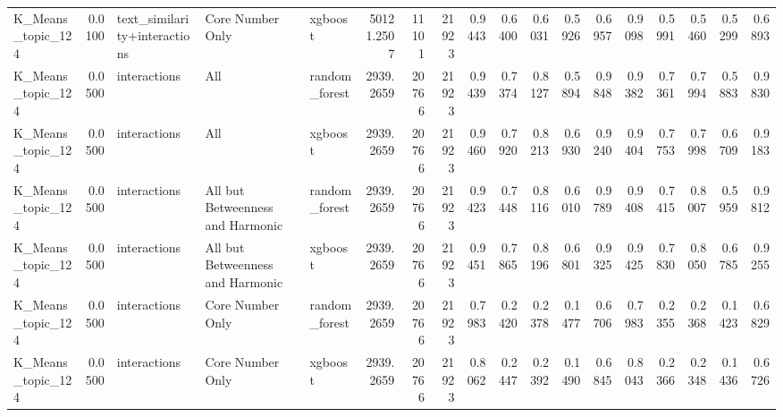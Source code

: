 \begin{tabular}{lrlllrrrrrrrrrrrrr}
K_Means_topic_124 & 0.0100 & text_similarity+interactions & Core Number Only & xgboost & 50121.2507 & 11101 & 21923 & 0.9443 & 0.6400 & 0.6031 & 0.5926 & 0.6957 & 0.9098 & 0.5991 & 0.5460 & 0.5299 & 0.6893 \\
K_Means_topic_124 & 0.0500 & interactions & All & random_forest & 2939.2659 & 20766 & 21923 & 0.9439 & 0.7374 & 0.8127 & 0.5894 & 0.9848 & 0.9382 & 0.7361 & 0.7994 & 0.5883 & 0.9830 \\
K_Means_topic_124 & 0.0500 & interactions & All & xgboost & 2939.2659 & 20766 & 21923 & 0.9460 & 0.7920 & 0.8213 & 0.6930 & 0.9240 & 0.9404 & 0.7753 & 0.7998 & 0.6709 & 0.9183 \\
K_Means_topic_124 & 0.0500 & interactions & All but Betweenness and Harmonic & random_forest & 2939.2659 & 20766 & 21923 & 0.9423 & 0.7448 & 0.8116 & 0.6010 & 0.9789 & 0.9408 & 0.7415 & 0.8007 & 0.5959 & 0.9812 \\
K_Means_topic_124 & 0.0500 & interactions & All but Betweenness and Harmonic & xgboost & 2939.2659 & 20766 & 21923 & 0.9451 & 0.7865 & 0.8196 & 0.6801 & 0.9325 & 0.9425 & 0.7830 & 0.8050 & 0.6785 & 0.9255 \\
K_Means_topic_124 & 0.0500 & interactions & Core Number Only & random_forest & 2939.2659 & 20766 & 21923 & 0.7983 & 0.2420 & 0.2378 & 0.1477 & 0.6706 & 0.7983 & 0.2355 & 0.2368 & 0.1423 & 0.6829 \\
K_Means_topic_124 & 0.0500 & interactions & Core Number Only & xgboost & 2939.2659 & 20766 & 21923 & 0.8062 & 0.2447 & 0.2392 & 0.1490 & 0.6845 & 0.8043 & 0.2366 & 0.2348 & 0.1436 & 0.6726 \\
\bottomrule
\end{tabular}
